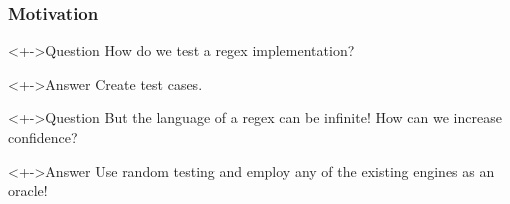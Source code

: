 \documentclass[pdftex,aspectratio=169]{beamer}
\begin{document}
\begin{frame}
  \frametitle{Motivation}
  \begin{block}<+->{Question}
    How do we test a regex implementation?
  \end{block}
  \begin{exampleblock}<+->{Answer}
    Create test cases.
  \end{exampleblock}
  \begin{block}<+->{Question}
    But the language of a regex can be infinite! How can we increase confidence?
  \end{block}
  \begin{exampleblock}<+->{Answer}
    Use random testing and employ any of the existing engines as an oracle!
  \end{exampleblock}
\end{frame}
\end{document}
